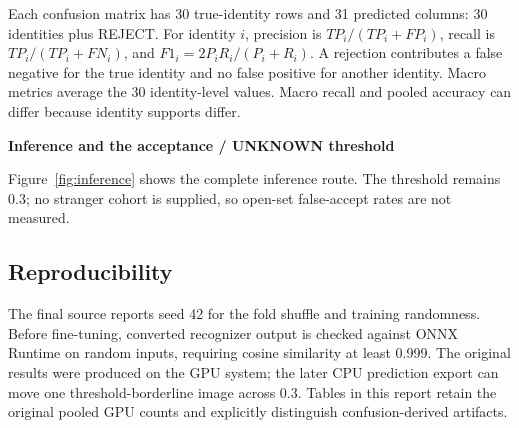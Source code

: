 \documentclass[11pt,a4paper]{article}
\newcommand{\cont}[1]{\par{\sffamily\bfseries #1}\par}
\begin{document}
Each confusion matrix has 30 true-identity rows and 31 predicted columns: 30 identities plus REJECT. For identity $i$, precision is $TP_i/(TP_i+FP_i)$, recall is $TP_i/(TP_i+FN_i)$, and $F1_i=2P_iR_i/(P_i+R_i)$. A rejection contributes a false negative for the true identity and no false positive for another identity. Macro metrics average the 30 identity-level values. Macro recall and pooled accuracy can differ because identity supports differ.

\cont{Inference and the acceptance / UNKNOWN threshold}
Figure~\ref{fig:inference} shows the complete inference route. The threshold remains 0.3; no stranger cohort is supplied, so open-set false-accept rates are not measured.
\begin{center}
\label{fig:inference}
\end{center}
\subsection{Reproducibility}
The final source reports seed 42 for the fold shuffle and training randomness. Before fine-tuning, converted recognizer output is checked against ONNX Runtime on random inputs, requiring cosine similarity at least 0.999. The original results were produced on the GPU system; the later CPU prediction export can move one threshold-borderline image across 0.3. Tables in this report retain the original pooled GPU counts and explicitly distinguish confusion-derived artifacts.
\end{document}
